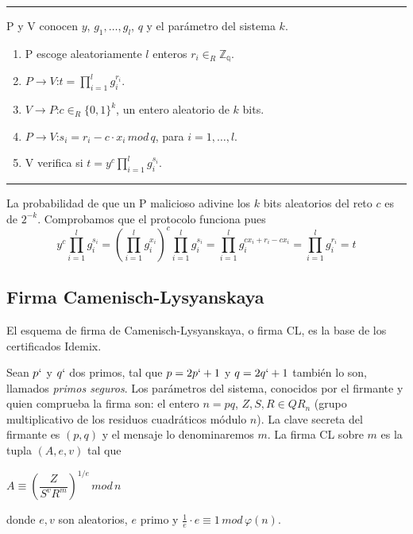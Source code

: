 \rule{\textwidth}{1pt}
\begin{algorithm}
	\hfil
	
	P y V conocen $y$, $g_1, \dots, g_l$, $q$ y el parámetro del sistema $k$.
	
	\begin{enumerate}
		\item P escoge aleatoriamente $l$ enteros $r_i \in_R \mathbb{Z_q}$.
		\item $P \rightarrow V$:\quad $t=\prod_{i=1}^{l}g_i^{r_i}$.
		\item $V \rightarrow P$:\quad $c \in_R \{0,1\}^k$, un entero aleatorio de $k$ bits.
		\item $P \rightarrow V$:\quad $s_i = r_i - c\cdot x_i \, mod \, q$, para $i=1,\dots,l$.
		\item V verifica si \quad $t = y^c \prod_{i=1}^{l} g_i^{s_i}$.
	\end{enumerate}
	
\end{algorithm}
\rule{\textwidth}{1pt}

La probabilidad de que un P malicioso adivine los $k$ bits aleatorios del reto $c$ es de $2^{-k}$. Comprobamos que el protocolo funciona pues
\[
	y^c  \prod_{i=1}^{l} g_i^{s_i} =  \left( \prod_{i=1}^{l} g_i^{x_i} \right) ^c \prod_{i=1}^{l} g_i^{s_i} = \prod_{i=1}^{l} g_i^{c x_i + r_i -c x_i} = \prod_{i=1}^{l} g_i^{r_i} = t
\]




\subsection{Firma Camenisch-Lysyanskaya}

El esquema de firma de Camenisch-Lysyanskaya, o firma CL, es la base de los certificados Idemix. 

Sean $p`$ y $q`$ dos primos, tal que $p=2p`+1$ y $q=2q`+1$ también lo son, llamados \textit{primos seguros}. Los parámetros del sistema, conocidos por el firmante y quien comprueba la firma son: el entero $n=pq$, $Z,S,R\in QR_n$ (grupo multiplicativo de los residuos cuadráticos módulo $n$). La clave secreta del firmante es $(p,q)$ y el mensaje lo denominaremos $m$. La firma CL sobre $m$ es la tupla $(A,e,v)$ tal que
\begin{center}
	$A \equiv \left( \dfrac{Z}{S^v R^m} \right) ^{1/e} \, mod \, n$
\end{center}
donde $e,v$ son aleatorios, $e$ primo y $\frac{1}{e}\cdot e \equiv 1 \, mod \, \varphi(n)$.


